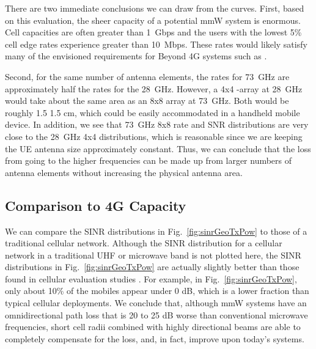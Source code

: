 \documentclass[journal]{IEEEtran}
\begin{document}
There are two immediate conclusions we can draw from the curves.
First, based on this evaluation, the sheer capacity of a potential
mmW system is enormous.  Cell capacities are often greater than 1~Gbps and
the users with the lowest 5\% cell edge rates experience greater than 10~Mbps.
These rates would likely satisfy
many of the envisioned requirements for Beyond 4G systems such as
\cite{NSN-B4G:12,Ghosh-mmw:2013}.

Second, for the same number of antenna elements, the rates for 73~GHz
are approximately half the rates for the 28~GHz.  However, a 4x4 -array
at 28~GHz would take about the same area as an 8x8  array at 73~GHz.
Both would be roughly 1.5 1.5 cm,
which could be easily accommodated in a handheld
mobile device.  In addition, we see that 73~GHz 8x8 rate and SNR distributions
are very close to the 28~GHz 4x4 distributions, which is reasonable since we are
keeping the UE antenna size approximately
constant.  Thus, we can conclude that the
loss from going to the higher frequencies can be made up from larger numbers of antenna
elements without increasing the physical antenna area.

\subsection{Comparison to 4G Capacity}

We can compare the SINR distributions in Fig.~\ref{fig:sinrGeoTxPow}
to those of a traditional cellular network.
Although the SINR distribution for a cellular network in a traditional
UHF or microwave band
is not plotted here, the SINR distributions in Fig.~\ref{fig:sinrGeoTxPow}
are actually slightly better than those found in cellular
evaluation studies \cite{3GPP36.814}.
For example,  in Fig.~\ref{fig:sinrGeoTxPow}, only about 10\% of the mobiles
appear under 0 dB, which is a lower fraction than typical cellular deployments.
We conclude that, although mmW systems have an omnidirectional path loss that
is 20 to 25 dB worse than conventional microwave frequencies, short cell radii combined
with highly directional beams are able to completely compensate for the loss,
and, in fact, improve upon today's systems.
\end{document}
